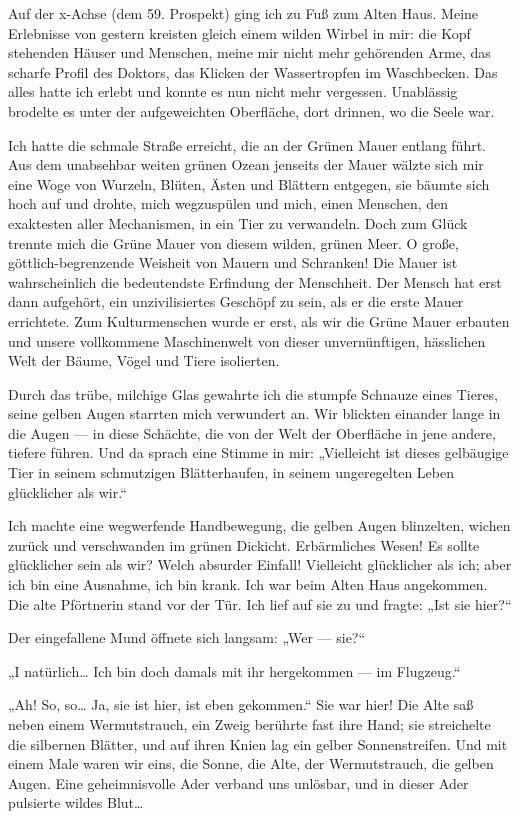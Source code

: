 Auf der x-Achse (dem 59. Prospekt) ging ich zu Fuß zum Alten Haus.
Meine Erlebnisse von gestern kreisten gleich einem wilden Wirbel in
mir: die Kopf stehenden Häuser und Menschen, meine mir nicht mehr
gehörenden Arme, das scharfe Profil des Doktors, das Klicken der
Wassertropfen im Waschbecken. Das alles hatte ich erlebt und konnte
es nun nicht mehr vergessen. Unablässig brodelte es unter der
aufgeweichten Oberfläche, dort drinnen, wo die Seele war.

Ich hatte die schmale Straße erreicht, die an der Grünen Mauer
entlang führt. Aus dem unabsehbar weiten grünen Ozean jenseits der
Mauer wälzte sich mir eine Woge von Wurzeln, Blüten, Ästen und
Blättern entgegen, sie bäumte sich hoch auf und drohte, mich
wegzuspülen und mich, einen Menschen, den exaktesten aller
Mechanismen, in ein Tier zu verwandeln. Doch zum Glück trennte mich
die Grüne Mauer von diesem wilden, grünen Meer. O große,
göttlich-begrenzende Weisheit von Mauern und Schranken! Die Mauer
ist wahrscheinlich die bedeutendste Erfindung der Menschheit. Der
Mensch hat erst dann aufgehört, ein unzivilisiertes Geschöpf zu
sein, als er die erste Mauer errichtete. Zum Kulturmenschen wurde
er erst, als wir die Grüne Mauer erbauten und unsere vollkommene
Maschinenwelt von dieser unvernünftigen, hässlichen Welt der Bäume,
Vögel und Tiere isolierten.

Durch das trübe, milchige Glas gewahrte ich die stumpfe Schnauze
eines Tieres, seine gelben Augen starrten mich verwundert an. Wir
blickten einander lange in die Augen — in diese Schächte, die von
der Welt der Oberfläche in jene andere, tiefere führen. Und da
sprach eine Stimme in mir: „Vielleicht ist dieses gelbäugige Tier
in seinem
schmutzigen Blätterhaufen, in seinem ungeregelten Leben glücklicher
als wir.“

Ich machte eine wegwerfende Handbewegung, die gelben Augen
blinzelten, wichen zurück und verschwanden im grünen Dickicht.
Erbärmliches Wesen! Es sollte glücklicher sein als wir? Welch
absurder Einfall! Vielleicht glücklicher als ich; aber ich bin eine
Ausnahme, ich bin krank. Ich war beim Alten Haus angekommen. Die
alte Pförtnerin stand vor der Tür. Ich lief auf sie zu und fragte:
„Ist sie hier?“

Der eingefallene Mund öffnete sich langsam: „Wer — sie?“

„I natürlich\ldots{} Ich bin doch damals mit ihr hergekommen — im
Flugzeug.“

„Ah! So, so\ldots{} Ja, sie ist hier, ist eben gekommen.“ Sie war hier!
Die Alte saß neben einem Wermutstrauch, ein Zweig berührte fast
ihre Hand; sie streichelte die silbernen Blätter, und auf ihren
Knien lag ein gelber Sonnenstreifen. Und mit einem Male waren wir
eins, die Sonne, die Alte, der Wermutstrauch, die gelben Augen.
Eine geheimnisvolle Ader verband uns unlösbar, und in dieser Ader
pulsierte wildes Blut\ldots{}


